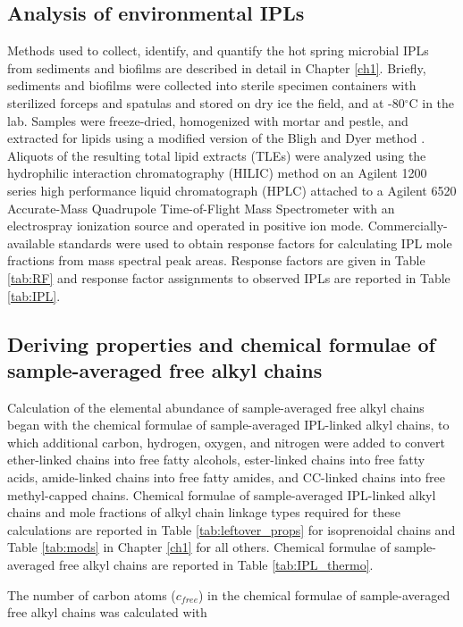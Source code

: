 \subsection{Analysis of environmental IPLs} Methods used to collect, identify, and quantify the hot spring microbial IPLs from sediments and biofilms are described in detail in Chapter \ref{ch1}. Briefly, sediments and biofilms were collected into sterile specimen containers with sterilized forceps and spatulas and stored on dry ice the field, and at -80$^{\circ}$C in the lab. Samples were freeze-dried, homogenized with mortar and pestle, and extracted for lipids using a modified version of the Bligh and Dyer method \citep{white1998signature}. Aliquots of the resulting total lipid extracts (TLEs) were analyzed using the hydrophilic interaction chromatography (HILIC) method \citep{Wrmer_Application_2013} on an Agilent 1200 series high performance liquid chromatograph (HPLC) attached to a Agilent 6520 Accurate-Mass Quadrupole Time-of-Flight Mass Spectrometer with an electrospray ionization source and operated in positive ion mode. Commercially-available standards were used to obtain response factors for calculating IPL mole fractions from mass spectral peak areas. Response factors are given in Table \ref{tab:RF} and response factor assignments to observed IPLs are reported in Table \ref{tab:IPL}.

\subsection{Deriving properties and chemical formulae of sample-averaged free alkyl chains}



Calculation of the elemental abundance of sample-averaged free alkyl chains began with the chemical formulae of sample-averaged IPL-linked alkyl chains, to which additional carbon, hydrogen, oxygen, and nitrogen were added to convert ether-linked chains into free fatty alcohols, ester-linked chains into free fatty acids, amide-linked chains into free fatty amides, and CC-linked chains into free methyl-capped chains. Chemical formulae of sample-averaged IPL-linked alkyl chains and mole fractions of alkyl chain linkage types required for these calculations are reported in Table \ref{tab:leftover_props} for isoprenoidal chains and Table \ref{tab:mods} in Chapter \ref{ch1} for all others. Chemical formulae of sample-averaged free alkyl chains are reported in Table \ref{tab:IPL_thermo}.

The number of carbon atoms ($c_{free}$) in the chemical formulae of sample-averaged free alkyl chains was calculated with

